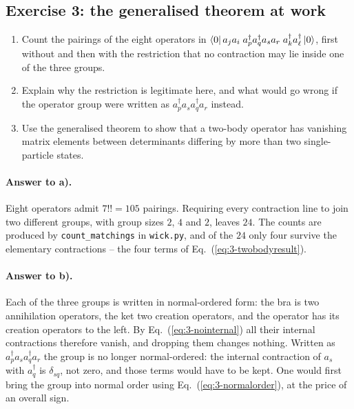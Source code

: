 \subsection*{Exercise 3: the generalised theorem at work}
\label{ex:3-generalised}

\begin{enumerate}
  \item[a)] Count the pairings of the eight operators in
  $\langle 0 \vert\,a_ja_i\;a_p^{\dagger}a_q^{\dagger}a_sa_r\;
  a_k^{\dagger}a_{\ell}^{\dagger}\,\vert 0 \rangle$, first without and then with the
  restriction that no contraction may lie inside one of the three groups.
  \item[b)] Explain why the restriction is legitimate here, and what would go
  wrong if the operator group were written as $a_p^{\dagger}a_sa_q^{\dagger}
  a_r$ instead.
  \item[c)] Use the generalised theorem to show that a two-body operator has
  vanishing matrix elements between determinants differing by more than two
  single-particle states.
\end{enumerate}

\paragraph{Answer to a).}
Eight operators admit $7!!=105$ pairings.  Requiring every contraction line to
join two different groups, with group sizes $2$, $4$ and $2$, leaves $24$.
The counts are produced by \texttt{count\_matchings} in \texttt{wick.py}, and
of the $24$ only four survive the elementary contractions -- the four terms of
Eq.~(\ref{eq:3-twobodyresult}).

\paragraph{Answer to b).}
Each of the three groups is written in normal-ordered form: the bra is two
annihilation operators, the ket two creation operators, and the operator has
its creation operators to the left.  By Eq.~(\ref{eq:3-nointernal}) all their
internal contractions therefore vanish, and dropping them changes nothing.
Written as $a_p^{\dagger}a_sa_q^{\dagger}a_r$ the group is no longer
normal-ordered: the internal contraction of $a_s$ with $a_q^{\dagger}$ is
$\delta_{sq}$, not zero, and those terms would have to be kept.  One would
first bring the group into normal order using
Eq.~(\ref{eq:3-normalorder}), at the price of an overall sign.

